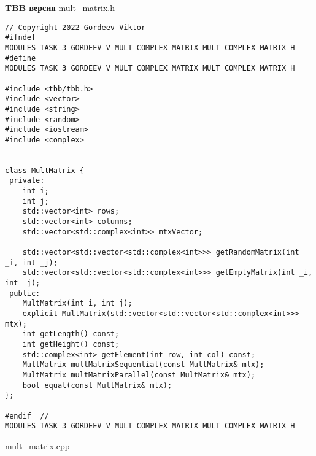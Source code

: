 \documentclass{report}
\begin{document}
\textbf{TBB версия}
\newline
\newline mult_matrix.h
\begin{lstlisting}
// Copyright 2022 Gordeev Viktor
#ifndef MODULES_TASK_3_GORDEEV_V_MULT_COMPLEX_MATRIX_MULT_COMPLEX_MATRIX_H_
#define MODULES_TASK_3_GORDEEV_V_MULT_COMPLEX_MATRIX_MULT_COMPLEX_MATRIX_H_

#include <tbb/tbb.h>
#include <vector>
#include <string>
#include <random>
#include <iostream>
#include <complex>


class MultMatrix {
 private:
    int i;
    int j;
    std::vector<int> rows;
    std::vector<int> columns;
    std::vector<std::complex<int>> mtxVector;

    std::vector<std::vector<std::complex<int>>> getRandomMatrix(int _i, int _j);
    std::vector<std::vector<std::complex<int>>> getEmptyMatrix(int _i, int _j);
 public:
    MultMatrix(int i, int j);
    explicit MultMatrix(std::vector<std::vector<std::complex<int>>> mtx);
    int getLength() const;
    int getHeight() const;
    std::complex<int> getElement(int row, int col) const;
    MultMatrix multMatrixSequential(const MultMatrix& mtx);
    MultMatrix multMatrixParallel(const MultMatrix& mtx);
    bool equal(const MultMatrix& mtx);
};

#endif  // MODULES_TASK_3_GORDEEV_V_MULT_COMPLEX_MATRIX_MULT_COMPLEX_MATRIX_H_

\end{lstlisting}
mult_matrix.cpp
\end{document}
